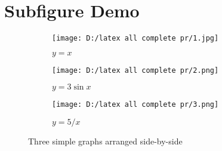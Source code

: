 \documentclass[10pt,a4paper]{article}
\begin{document}
	
	\section*{Subfigure Demo} 
	
	
	\begin{figure}[h]
		\centering
		\begin{subfigure}[b]{0.3\textwidth}
			\centering
			\texttt{[image: D:/latex all complete pr/1.jpg]} 
			\caption{$y=x$}
			\label{fig:y equals x}
		\end{subfigure}
		\hfill
		\begin{subfigure}[b]{0.3\textwidth}
			\centering
			\texttt{[image: D:/latex all complete pr/2.png]}
			\caption{$y=3\sin x$}
			\label{fig:three sin x}
		\end{subfigure}
		\hfill
		\begin{subfigure}[b]{0.3\textwidth}
			\centering
			\texttt{[image: D:/latex all complete pr/3.png]}
			\caption{$y=5/x$}
			\label{fig:five over x}
		\end{subfigure}
		\caption{Three simple graphs arranged side-by-side}
		\label{fig:three graphs}
	\end{figure}
	
\end{document}
